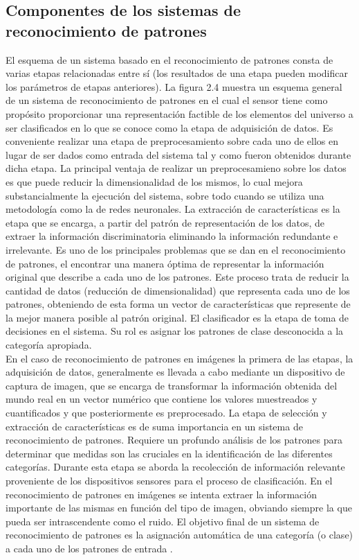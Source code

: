 \subsection{Componentes de los sistemas de reconocimiento de patrones}

El esquema de un sistema basado en el reconocimiento de patrones consta de varias etapas relacionadas entre sí (los resultados de una etapa pueden modificar los parámetros de etapas anteriores). La figura 2.4 muestra un esquema general de un sistema de reconocimiento de patrones en el cual el sensor tiene como propósito proporcionar una representación factible de los elementos del universo a ser clasificados en lo que se conoce como la etapa de adquisición de datos. Es conveniente realizar una etapa de preprocesamiento sobre cada uno de ellos en lugar de ser dados como entrada del sistema tal y como fueron obtenidos durante dicha etapa. La principal ventaja de realizar un preprocesamieno sobre los datos es que puede reducir la dimensionalidad de los mismos, lo cual mejora substancialmente la ejecución del sistema, sobre todo cuando se utiliza una metodología como la de redes neuronales. La extracción de características es la etapa que se encarga, a partir del patrón de representación de los datos, de extraer la información discriminatoria eliminando la información redundante e irrelevante. Es uno de los principales problemas que se dan en el reconocimiento de patrones, el encontrar una manera óptima de representar la información original que describe a cada uno de los patrones. Este proceso trata de reducir la cantidad de datos (reducción de dimensionalidad) que representa cada uno de los patrones, obteniendo de esta forma un vector de características que represente de la mejor manera posible al patrón original. El clasificador es la etapa de toma de decisiones en el sistema. Su rol es asignar los patrones de clase desconocida a la categoría apropiada. \\

En el caso de reconocimiento de patrones en imágenes la primera de las etapas, la adquisición de datos, generalmente es llevada a cabo mediante un dispositivo de captura de imagen, que se encarga de transformar la información obtenida del mundo real en un vector numérico que contiene los valores muestreados y cuantificados y que posteriormente es preprocesado. La etapa de selección y extracción de características es de suma importancia en un sistema de reconocimiento de patrones. Requiere un profundo análisis de los patrones para determinar que medidas son las cruciales en la identificación de las diferentes categorías. Durante esta etapa se aborda la recolección de información relevante proveniente de los dispositivos sensores para el proceso de clasificación. En el reconocimiento de patrones en imágenes se intenta extraer la información importante de las mismas en función del tipo de imagen, obviando siempre la que pueda ser intrascendente como el ruido. El objetivo final de un sistema de reconocimiento de patrones es la asignación automática de una categoría (o clase) a cada uno de los patrones de entrada \cite{Reference8}. \\

